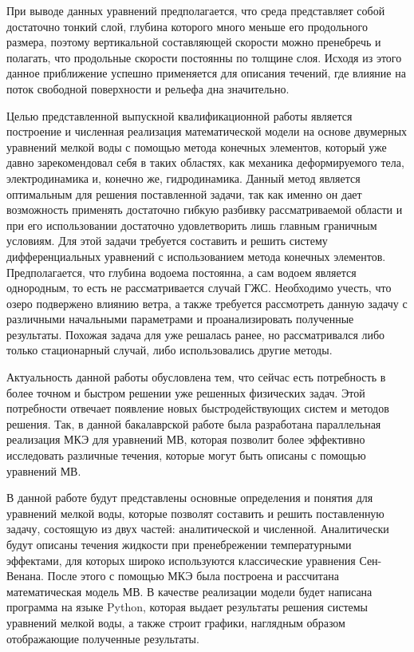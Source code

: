 \documentclass[14pt]{extreport}
\begin{document}
При выводе данных уравнений предполагается, что среда представляет собой достаточно тонкий слой, глубина которого много меньше его продольного размера, поэтому вертикальной составляющей скорости можно пренебречь и полагать, что продольные скорости постоянны по толщине слоя.  Исходя из этого данное приближение успешно применяется для описания течений, где влияние на поток свободной поверхности и рельефа дна значительно.

Целью представленной выпускной квалификационной работы является построение и численная реализация математической модели на основе двумерных уравнений мелкой воды с помощью метода конечных элементов, который уже давно зарекомендовал\cite{bib:fem:nory} себя в таких областях, как механика деформируемого тела, электродинамика и, конечно же, гидродинамика. Данный метод является оптимальным для решения поставленной задачи, так как именно он дает возможность применять достаточно гибкую разбивку рассматриваемой области и при его использовании достаточно удовлетворить лишь главным граничным условиям. Для этой задачи требуется составить и решить систему дифференциальных уравнений с использованием метода конечных элементов. Предполагается, что глубина водоема постоянна, а сам водоем является однородным, то есть не рассматривается случай ГЖС. Необходимо учесть, что озеро подвержено влиянию ветра, а также требуется рассмотреть данную задачу с различными начальными параметрами и проанализировать полученные результаты. Похожая задача для уже решалась ранее, но рассматривался либо только стационарный случай\cite{bib:pankratov:2014:RTMV}, либо использовались другие методы\cite{bib:pankratov:2016:ANYMV}.

Актуальность данной работы обусловлена тем, что сейчас есть потребность в более точном и быстром решении уже решенных физических задач. Этой потребности отвечает появление новых быстродействующих систем и методов решения. Так, в данной бакалаврской работе была разработана параллельная реализация МКЭ для уравнений МВ, которая позволит более эффективно исследовать различные течения, которые могут быть описаны с помощью уравнений МВ.

В данной работе будут представлены основные определения и понятия для уравнений мелкой воды, которые позволят составить и решить поставленную задачу, состоящую из двух частей: аналитической и численной. Аналитически будут описаны течения жидкости при пренебрежении температурными эффектами, для которых широко используются классические уравнения Сен-Венана. После этого с помощью МКЭ была построена и рассчитана математическая модель МВ. В качестве реализации модели будет написана программа на языке Python\cite{bib:python:lutz:2013,bib:python:nm:2013}, которая выдает результаты решения системы уравнений мелкой воды, а также строит графики, наглядным образом отображающие полученные результаты.
\end{document}
